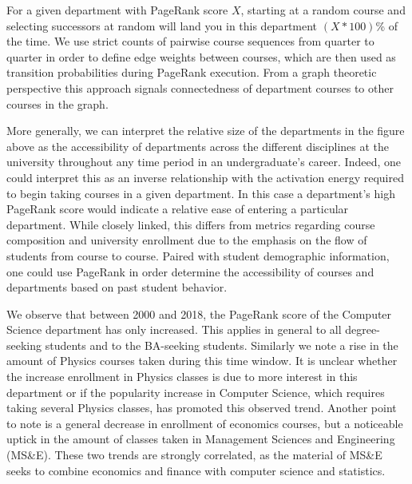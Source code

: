 \documentclass{sigchi}
\begin{document}
For a given department with PageRank score $X$, starting at a random course and selecting successors at random will land you in this department $(X * 100)$\% of the time. We use strict counts of pairwise course sequences from quarter to quarter in order to define edge weights between courses, which are then used as transition probabilities during PageRank execution. From a graph theoretic perspective this approach signals connectedness of department courses to other courses in the graph.

More generally, we can interpret the relative size of the departments in the figure above as the accessibility of departments across the different disciplines at the university throughout any time period in an undergraduate's career. Indeed, one could interpret this as an inverse relationship with the activation energy required to begin taking courses in a given department. In this case a department's high PageRank score would indicate a relative ease of entering a particular department. While closely linked, this differs from metrics regarding course composition and university enrollment due to the emphasis on the flow of students from course to course. Paired with student demographic information, one could use PageRank in order determine the accessibility of courses and departments based on past student behavior.

We observe that between 2000 and 2018, the PageRank score of the Computer Science department has only increased. This applies in general to all degree-seeking students and to the BA-seeking students. Similarly we note a rise in the amount of Physics courses taken during this time window. It is unclear whether the increase enrollment in Physics classes is due to more interest in this department or if the popularity increase in Computer Science, which requires taking several Physics classes, has promoted this observed trend. Another point to note is a general decrease in enrollment of economics courses, but a noticeable uptick in the amount of classes taken in Management Sciences and Engineering (MS\&E). These two trends are strongly correlated, as the material of MS\&E seeks to combine economics and finance with computer science and statistics. 
\end{document}

